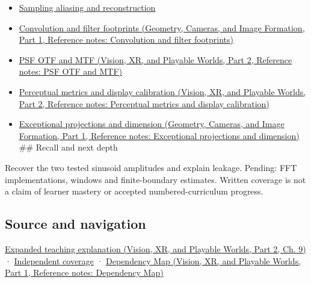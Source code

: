 \hypertarget{appendix-b60686ba06a1-used-by}{}

\begin{itemize}
\item
  \hyperref[appendix-6a7869dd79a6]{Sampling aliasing and reconstruction}
\item
  \href{../03-Geometry-Cameras-and-Image-Formation-P01/main.pdf\#appendix-d5b3c692d9f0}{Convolution and filter footprints (Geometry, Cameras, and Image Formation, Part 1, Reference notes: Convolution and filter footprints)}
\item
  \href{../07-Vision-XR-and-Playable-Worlds-P02/main.pdf\#appendix-8b76b0efd27f}{PSF OTF and MTF (Vision, XR, and Playable Worlds, Part 2, Reference notes: PSF OTF and MTF)}
\item
  \href{../07-Vision-XR-and-Playable-Worlds-P02/main.pdf\#appendix-b2c1846508bf}{Perceptual metrics and display calibration (Vision, XR, and Playable Worlds, Part 2, Reference notes: Perceptual metrics and display calibration)}
\item
  \href{../03-Geometry-Cameras-and-Image-Formation-P01/main.pdf\#appendix-3c73f7862157}{Exceptional projections and dimension (Geometry, Cameras, and Image Formation, Part 1, Reference notes: Exceptional projections and dimension)} \#\# Recall and next depth
\end{itemize}

Recover the two tested sinusoid amplitudes and explain leakage. Pending: FFT implementations, windows and finite-boundary estimates. Written coverage is not a claim of learner mastery or accepted numbered-curriculum progress.

\subsection{Source and navigation}\label{appendix-b60686ba06a1-source-and-navigation}

\hypertarget{appendix-b60686ba06a1-source-and-navigation}{}

\href{../07-Vision-XR-and-Playable-Worlds-P02/main.pdf\#04-visual-computing-ii-ch042-fourier-coordinates-reveal-what-a-filter-removes}{Expanded teaching explanation (Vision, XR, and Playable Worlds, Part 2, Ch. 9)} · \hyperref[appendix-fd090d982a15-xr01---independent-seeing-and-representation-source]{Independent coverage} · \href{../07-Vision-XR-and-Playable-Worlds-P01/main.pdf\#appendix-4ad47bdd269a}{Dependency Map (Vision, XR, and Playable Worlds, Part 1, Reference notes: Dependency Map)}

